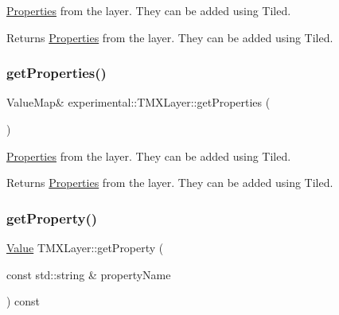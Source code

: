 \hyperlink{classProperties}{Properties} from the layer. They can be added using Tiled.

\begin{DoxyReturn}{Returns}
\hyperlink{classProperties}{Properties} from the layer. They can be added using Tiled. 
\end{DoxyReturn}
\mbox{\label{classexperimental_1_1TMXLayer_a356924361624560f9964aa9140a1f94a}} 
\subsubsection{\texorpdfstring{get\+Properties()}{getProperties()}\hspace{0.1cm}{\footnotesize\ttfamily [4/4]}}
{\footnotesize\ttfamily Value\+Map\& experimental\+::\+T\+M\+X\+Layer\+::get\+Properties (\begin{DoxyParamCaption}{ }\end{DoxyParamCaption})\hspace{0.3cm}{\ttfamily [inline]}}

\hyperlink{classProperties}{Properties} from the layer. They can be added using Tiled.

\begin{DoxyReturn}{Returns}
\hyperlink{classProperties}{Properties} from the layer. They can be added using Tiled. 
\end{DoxyReturn}
\mbox{\label{classexperimental_1_1TMXLayer_a6ed296d4b13f396f00815266c74054ff}} 
\subsubsection{\texorpdfstring{get\+Property()}{getProperty()}\hspace{0.1cm}{\footnotesize\ttfamily [1/2]}}
{\footnotesize\ttfamily \hyperlink{classValue}{Value} T\+M\+X\+Layer\+::get\+Property (\begin{DoxyParamCaption}\item[{const std\+::string \&}]{property\+Name }\end{DoxyParamCaption}) const}

